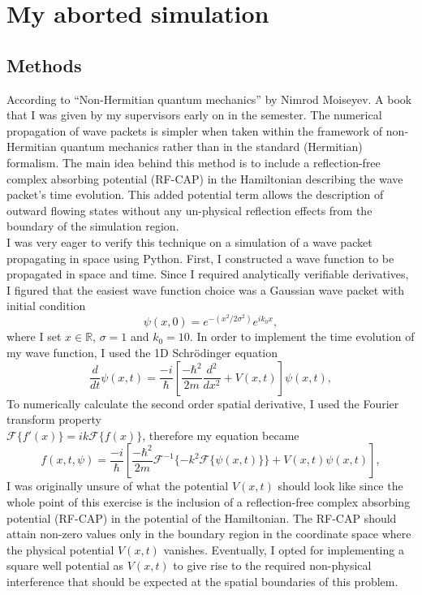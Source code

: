 \documentclass[10pt, a4paper, singlespacing]{report}
\begin{document}
\chapter{My aborted simulation}\label{Aborted}
\section{Methods}
According to ``Non-Hermitian quantum mechanics'' by Nimrod Moiseyev. A book that I was given by my supervisors early on in the semester. The numerical propagation of wave packets is simpler when taken within the framework of non-Hermitian quantum mechanics rather than in the standard (Hermitian) formalism\cite{Moiseyev}. The main idea behind this method is to include a reflection-free complex absorbing potential (RF-CAP) in the Hamiltonian describing the wave packet's time evolution. This added potential term allows the description of outward flowing states without any un-physical reflection effects from the boundary of the simulation region.\\
I was very eager to verify this technique on a simulation of a wave packet propagating in space using Python. First, I constructed a wave function to be propagated in space and time. Since I required analytically verifiable derivatives, I figured that the easiest wave function choice was a Gaussian wave packet with initial condition 
\begin{equation} \label{eq:13}
\psi(x, 0) = e^{-(x^2/2\sigma^2)}e^{ik_{0}x},
\end{equation}
where I set $x \in \mathds{R}$, $\sigma = 1$ and $k_{0} = 10$. In order to implement the time evolution of my wave function, I used the 1D Schrödinger equation
 \begin{equation} \label{eq:14}
\frac{d}{dt}\psi(x, t) = \frac{-i}{\hbar} \left [ \frac{-\hbar^2}{2m} \frac{d^2}{dx^2} + V(x, t)\right ] \psi(x, t),
\end{equation}
To numerically calculate the second order spatial derivative, I used the Fourier transform property \\\mbox{$\mathcal{F}\{f'(x)\} = ik\mathcal{F}\{f(x)\}$}, therefore my equation became
\begin{equation} \label{eq:15}
f(x, t, \psi) = \frac{-i}{\hbar} \left [ \frac{-\hbar^2}{2m} \mathcal{F}^{-1}\{-k^2\mathcal{F}\{\psi(x, t)\}\} + V(x, t)\psi(x, t)\right ],
\end{equation}
I was originally unsure of what the potential $V(x,t)$ should look like since the whole point of this exercise is the inclusion of a reflection-free complex absorbing potential (RF-CAP) in the potential of the Hamiltonian. The RF-CAP should attain non-zero values only in the boundary region in the coordinate space where the physical potential $V(x,t)$ vanishes\cite{Moiseyev}. Eventually, I opted for implementing a square well potential as $V(x,t)$ to give rise to the required non-physical interference that should be expected at the spatial boundaries of this problem.
\end{document}
